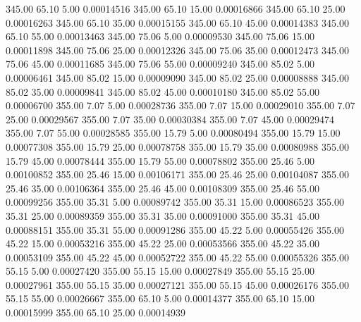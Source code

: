     345.00     65.10      5.00     0.00014516
    345.00     65.10     15.00     0.00016866
    345.00     65.10     25.00     0.00016263
    345.00     65.10     35.00     0.00015155
    345.00     65.10     45.00     0.00014383
    345.00     65.10     55.00     0.00013463
    345.00     75.06      5.00     0.00009530
    345.00     75.06     15.00     0.00011898
    345.00     75.06     25.00     0.00012326
    345.00     75.06     35.00     0.00012473
    345.00     75.06     45.00     0.00011685
    345.00     75.06     55.00     0.00009240
    345.00     85.02      5.00     0.00006461
    345.00     85.02     15.00     0.00009090
    345.00     85.02     25.00     0.00008888
    345.00     85.02     35.00     0.00009841
    345.00     85.02     45.00     0.00010180
    345.00     85.02     55.00     0.00006700
    355.00      7.07      5.00     0.00028736
    355.00      7.07     15.00     0.00029010
    355.00      7.07     25.00     0.00029567
    355.00      7.07     35.00     0.00030384
    355.00      7.07     45.00     0.00029474
    355.00      7.07     55.00     0.00028585
    355.00     15.79      5.00     0.00080494
    355.00     15.79     15.00     0.00077308
    355.00     15.79     25.00     0.00078758
    355.00     15.79     35.00     0.00080988
    355.00     15.79     45.00     0.00078444
    355.00     15.79     55.00     0.00078802
    355.00     25.46      5.00     0.00100852
    355.00     25.46     15.00     0.00106171
    355.00     25.46     25.00     0.00104087
    355.00     25.46     35.00     0.00106364
    355.00     25.46     45.00     0.00108309
    355.00     25.46     55.00     0.00099256
    355.00     35.31      5.00     0.00089742
    355.00     35.31     15.00     0.00086523
    355.00     35.31     25.00     0.00089359
    355.00     35.31     35.00     0.00091000
    355.00     35.31     45.00     0.00088151
    355.00     35.31     55.00     0.00091286
    355.00     45.22      5.00     0.00055426
    355.00     45.22     15.00     0.00053216
    355.00     45.22     25.00     0.00053566
    355.00     45.22     35.00     0.00053109
    355.00     45.22     45.00     0.00052722
    355.00     45.22     55.00     0.00055326
    355.00     55.15      5.00     0.00027420
    355.00     55.15     15.00     0.00027849
    355.00     55.15     25.00     0.00027961
    355.00     55.15     35.00     0.00027121
    355.00     55.15     45.00     0.00026176
    355.00     55.15     55.00     0.00026667
    355.00     65.10      5.00     0.00014377
    355.00     65.10     15.00     0.00015999
    355.00     65.10     25.00     0.00014939
